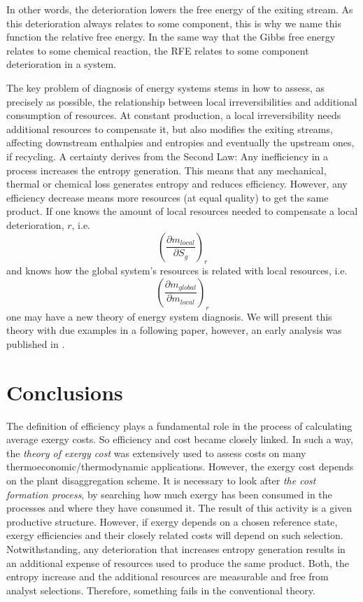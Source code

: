 \documentclass[energies,article,submit,moreauthors,pdftex]{Definitions/mdpi}
\begin{document}
In other words, the deterioration lowers the free energy of the exiting stream. As this deterioration always relates to some component, this is why we name this function the relative free energy. In the same way that the Gibbs free energy relates to some chemical reaction, the RFE relates to some component deterioration in a system.

The key problem of diagnosis of energy systems stems in how to assess, as precisely as possible, the relationship between local irreversibilities and additional consumption of resources. At constant production, a local irreversibility needs additional resources to compensate it, but also modifies the exiting streams, affecting downstream enthalpies and entropies and eventually the upstream ones, if recycling.
A certainty derives from the Second Law: Any inefficiency in a process increases the entropy generation. This means that any mechanical, thermal or chemical loss generates entropy and reduces efficiency. However, any efficiency decrease means more resources (at equal quality) to get the same product.
If one knows the amount of local resources needed to compensate a local deterioration, $r$, i.e.
\[
\left(\frac{\partial m_{local}}{\partial S_g}\right)_r
\]
and knows how the global system's resources is related with local resources, i.e.
\[
\left(\frac{\partial m_{global}}{\partial m_{local}}\right)_r
\]
one may have a new theory of energy system diagnosis. We will present this theory with due examples in a following paper, however, an early analysis was published in \cite{Royo1997}.

\section{Conclusions}
The definition of efficiency plays a fundamental role in the process of calculating average exergy costs. So efficiency and cost became closely linked. In such a way, the \emph{theory of exergy cost} \cite{Valero1986a,Lozano1993} was extensively used to assess costs on many thermoeconomic/thermodynamic applications. However, the exergy cost depends on the plant disaggregation scheme. It is necessary to look after \emph{the cost formation process}, by searching how much exergy has been consumed in the processes and where they have consumed it. The result of this activity is a given productive structure. However, if exergy depends on a chosen reference state, exergy efficiencies and their closely related costs will depend on such selection. Notwithstanding, any deterioration that increases entropy generation results in an additional expense of resources used to produce the same product. Both, the entropy increase and the additional resources are measurable and free from analyst selections. Therefore, something fails in the conventional theory.
\end{document}
